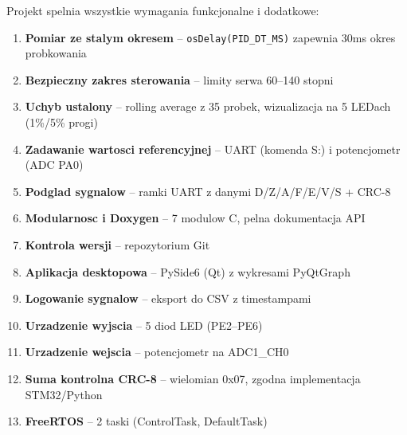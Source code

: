 \documentclass[11pt]{article}
\begin{document}
Projekt spelnia wszystkie wymagania funkcjonalne i dodatkowe:

\begin{enumerate}
    \item \textbf{Pomiar ze stalym okresem} -- \texttt{osDelay(PID\_DT\_MS)} zapewnia 30ms okres probkowania
    \item \textbf{Bezpieczny zakres sterowania} -- limity serwa 60--140 stopni
    \item \textbf{Uchyb ustalony} -- rolling average z 35 probek, wizualizacja na 5 LEDach (1\%/5\% progi)
    \item \textbf{Zadawanie wartosci referencyjnej} -- UART (komenda S:) i potencjometr (ADC PA0)
    \item \textbf{Podglad sygnalow} -- ramki UART z danymi D/Z/A/F/E/V/S + CRC-8
    \item \textbf{Modularnosc i Doxygen} -- 7 modulow C, pelna dokumentacja API
    \item \textbf{Kontrola wersji} -- repozytorium Git
    \item \textbf{Aplikacja desktopowa} -- PySide6 (Qt) z wykresami PyQtGraph
    \item \textbf{Logowanie sygnalow} -- eksport do CSV z timestampami
    \item \textbf{Urzadzenie wyjscia} -- 5 diod LED (PE2--PE6)
    \item \textbf{Urzadzenie wejscia} -- potencjometr na ADC1\_CH0
    \item \textbf{Suma kontrolna CRC-8} -- wielomian 0x07, zgodna implementacja STM32/Python
    \item \textbf{FreeRTOS} -- 2 taski (ControlTask, DefaultTask)
\end{enumerate}
\end{document}
